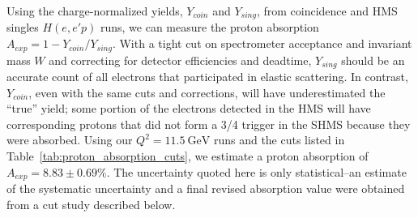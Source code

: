 Using the charge-normalized yields, $Y_{coin}$ and $Y_{sing}$, from coincidence
and HMS singles $H(e,e'p)$ runs, we can measure the proton absorption
$A_{exp}=1-Y_{coin}/Y_{sing}$.
With a tight cut on spectrometer acceptance and invariant mass $W$ and
correcting for detector efficiencies and deadtime, $Y_{sing}$ should be an
accurate count of all electrons that participated in elastic scattering.
In contrast, $Y_{coin}$, even with the same cuts and corrections, will have
underestimated the ``true'' yield; some portion of the electrons detected in the
HMS will have corresponding protons that did not form a 3/4 trigger in the SHMS
because they were absorbed.
Using our $Q^2 = \SI{11.5}{\giga\electronvolt}$ runs and the cuts listed in
Table~\ref{tab:proton_absorption_cuts}, we estimate a proton absorption of
$A_{exp}=8.83 \pm 0.69 \%$.
The uncertainty quoted here is only statistical--an estimate of the systematic
uncertainty and a final revised absorption value were obtained from a cut study
described below.

\begin{table}[h]
    \centering
    \caption{List of cuts used in proton absorption estimate.}
    \label{tab:proton_absorption_cuts}
\end{table}

